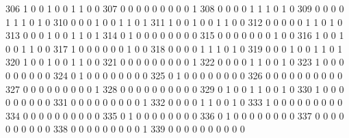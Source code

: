 \documentclass[compress,8pt]{beamer}
\begin{document}
\begin{frame}
\begin{Schunk}
  306      1       0   0              1        0    0       1       1   0   0
  307      0       0   0              0        0    0       0       0   0   1
  308      0       0   0              0        1    1       1       0   1   0
  309      0       0   0              0        1    1       1       0   1   0
  310      0       0   0              1        0    0       1       1   0   1
  311      1       0   0              1        0    0       1       1   0   0
  312      0       0   0              0        0    1       1       0   1   0
  313      0       0   0              1        0    0       1       1   0   1
  314      0       1   0              0        0    0       0       0   0   0
  315      0       0   0              0        0    0       0       1   0   0
  316      1       0   0              1        0    0       1       1   0   0
  317      1       0   0              0        0    0       0       1   0   0
  318      0       0   0              0        1    1       1       0   1   0
  319      0       0   0              1        0    0       1       1   0   1
  320      1       0   0              1        0    0       1       1   0   0
  321      0       0   0              0        0    0       0       0   0   1
  322      0       0   0              0        1    1       0       0   1   0
  323      1       0   0              0        0    0       0       0   0   0
  324      0       1   0              0        0    0       0       0   0   0
  325      0       1   0              0        0    0       0       0   0   0
  326      0       0   0              0        0    0       0       0   0   0
  327      0       0   0              0        0    0       0       0   0   1
  328      0       0   0              0        0    0       0       0   0   0
  329      0       1   0              0        1    1       0       0   1   0
  330      1       0   0              0        0    0       0       0   0   0
  331      0       0   0              0        0    0       0       0   0   1
  332      0       0   0              0        1    1       0       0   1   0
  333      1       0   0              0        0    0       0       0   0   0
  334      0       0   0              0        0    0       0       0   0   0
  335      0       1   0              0        0    0       0       0   0   0
  336      0       1   0              0        0    0       0       0   0   0
  337      0       0   0              0        0    0       0       0   0   0
  338      0       0   0              0        0    0       0       0   0   1
  339      0       0   0              0        0    0       0       0   0   0

\end{Schunk}
\end{frame}
\end{document}
